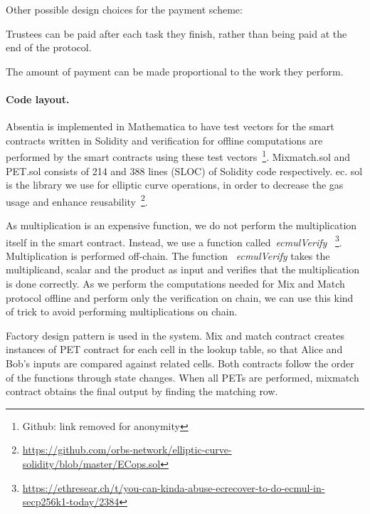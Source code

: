 Other possible design choices for the payment scheme:

Trustees can be paid after each task they finish, rather than being paid at the end of the protocol.

The amount of payment can be made proportional to the work they perform.




\paragraph{Code layout.} 

Absentia is implemented in Mathematica to have test vectors for the smart contracts written in Solidity and verification for offline computations are performed by the smart contracts using these test vectors~\footnote{Github: link removed for anonymity}. Mixmatch.sol and PET.sol  consists of 214 and 388 lines (SLOC) of Solidity code respectively. ec. sol is the library we use for elliptic curve operations, in order to decrease the gas usage and enhance reusability~\footnote{\url{https://github.com/orbs-network/elliptic-curve-solidity/blob/master/ECops.sol}}. 

As multiplication is an expensive function, we do not perform the multiplication itself in the smart contract. Instead, we use a function called~\emph{ecmulVerify}  ~\footnote{\url{https://ethresear.ch/t/you-can-kinda-abuse-ecrecover-to-do-ecmul-in-secp256k1-today/2384}}. Multiplication is performed off-chain. The function ~\emph{ecmulVerify}  takes the multiplicand, scalar and the product as input and verifies that the multiplication is done correctly. As we perform the computations needed for Mix and Match protocol offline and perform only the verification on chain, we can use this kind of trick to avoid performing multiplications on chain.

Factory design pattern is used in the system. Mix and match contract creates instances of PET contract for each cell in the lookup table, so that Alice and Bob's inputs are compared against related cells. Both contracts follow the order of the functions through state changes. When all PETs are performed, mixmatch contract obtains the final output by finding the matching row.

